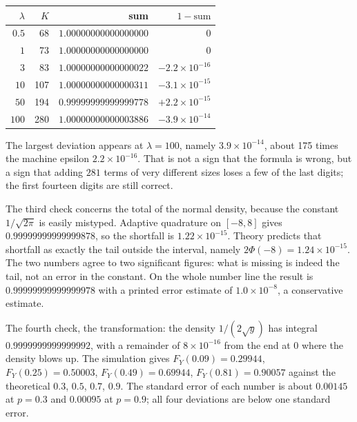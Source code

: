 \begin{center}\small
\begin{tabular}{rrrr}
\hline
$\lambda$ & $K$ & sum & $1-\text{sum}$ \\
\hline
$0.5$ & 68 & $1.00000000000000000$ & $0$ \\
$1$ & 73 & $1.00000000000000000$ & $0$ \\
$3$ & 83 & $1.00000000000000022$ & $-2.2\times10^{-16}$ \\
$10$ & 107 & $1.00000000000000311$ & $-3.1\times10^{-15}$ \\
$50$ & 194 & $0.99999999999999778$ & $+2.2\times10^{-15}$ \\
$100$ & 280 & $1.00000000000003886$ & $-3.9\times10^{-14}$ \\
\hline
\end{tabular}
\end{center}

The largest deviation appears at $\lambda=100$, namely $3.9\times10^{-14}$, about
175 times the machine epsilon $2.2\times10^{-16}$. That is not a sign that the formula is wrong, but a
sign that adding $281$ terms of very different sizes loses a few of the last
digits; the first fourteen digits are still correct.

The third check concerns the total of the normal density, because the constant
$1/\sqrt{2\pi}$ is easily mistyped. Adaptive quadrature on $[-8,8]$ gives
$0.99999999999999878$, so the shortfall is $1.22\times10^{-15}$. Theory
predicts that shortfall as exactly the tail outside the interval, namely
$2\Phi(-8)=1.24\times10^{-15}$. The two numbers agree to two significant figures: what
is missing is indeed the tail, not an error in the constant. On the whole number line the result is
$0.99999999999999978$ with a printed error estimate of $1.0\times10^{-8}$, a conservative
estimate.

The fourth check, the transformation: the density $1/(2\sqrt y)$ has integral
$0.9999999999999992$, with a remainder of $8\times10^{-16}$ from the end at $0$ where the density
blows up. The simulation gives $F_Y(0.09)=0.29944$, $F_Y(0.25)=0.50003$,
$F_Y(0.49)=0.69944$, $F_Y(0.81)=0.90057$ against the theoretical $0.3$, $0.5$,
$0.7$, $0.9$. The standard error of each number is about $0.00145$ at $p=0.3$ and
$0.00095$ at $p=0.9$; all four deviations are below one standard error.


